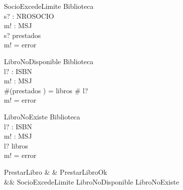 \begin{schema}{SocioExcedeLimite}
\Xi Biblioteca \\
s? : NROSOCIO \\
m! : MSJ \\
\where
s? \in \dom prestados \\
m! = error \\
\end{schema}

\begin{schema}{LibroNoDisponible}
\Xi Biblioteca \\
l? : ISBN \\ 
m! : MSJ \\
\where
\#(prestados \rres {}) = libros \# l? \\
m! = error \\
\end{schema}

\begin{schema}{LibroNoExiste}
\Xi Biblioteca \\
l? : ISBN \\ 
m! : MSJ \\
\where
l? \notin \dom libros \\
m! = error \\
\end{schema}

\begin{syntax}
PrestarLibro &  & PrestarLibroOk \lor \\
&& SocioExcedeLimite \lor LibroNoDisponible \lor LibroNoExiste \\
\end{syntax}